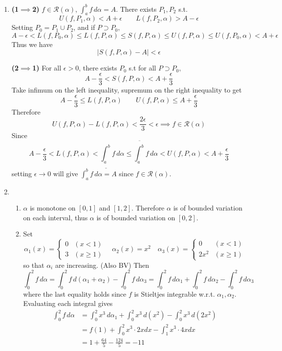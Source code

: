 \documentclass[11pt]{report}
\newcommand{\mc}[1]{\mathcal{#1}}
\newcommand{\ra}{\rightarrow}
\newcommand{\abs}[1]{\left|#1\right|}
\newcommand{\imp}{\implies}
\newcommand{\mimp}{$\implies$}
\renewcommand{\d}{\,d}
\newcommand{\lint}[1]{\underline{\int#1}}
\newcommand{\uint}[1]{\overline{\int#1}}
\begin{document}
\begin{enumerate}
\item \textsf{\textbf{(1\mimp2)}} $f\in \mc{R}(\alpha)$, $\int_a^b f\d\alpha = A$. There exists $P_1, P_2$ s.t.
$$U(f, P_1, \alpha) < A+\epsilon \qquad L(f, P_2, \alpha) > A- \epsilon$$
Setting $P_0 = P_1\cup P_2$, and if $P\supset P_0$,
$$A-\epsilon < L(f, P_0, \alpha) \leq L(f, P, \alpha) \leq S(f, P, \alpha) \leq U(f, P, \alpha) \leq U(f, P_0, \alpha) < A+ \epsilon$$
Thus we have
$$\abs{S(f, P, \alpha) - A} <\epsilon$$

\textsf{\textbf{(2\mimp1)}} For all $\epsilon > 0$, there exists $P_0$ s.t for all $P\supset P_0$, $$A - \frac{\epsilon}{3} < S(f, P, \alpha) < A+\frac{\epsilon}{3}$$
Take infimum on the left inequality, supremum on the right inequality to get
$$A-\frac{\epsilon}{3} \leq L(f, P, \alpha) \qquad U(f, P, \alpha) \leq A+\frac{\epsilon}{3}$$
Therefore
$$U(f, P, \alpha) - L(f, P, \alpha) < \frac{2\epsilon}{3} <\epsilon \imp f\in \mc{R}(\alpha)$$
Since
$$ A - \frac{\epsilon}{3} < L(f, P, \alpha) < \lint{_a^b} f\d\alpha \leq \uint{_a^b}f\d\alpha < U(f, P, \alpha) < A + \frac{\epsilon}{3}$$
setting $\epsilon\ra 0$ will give $\int_a^b f\d\alpha = A$ since $f\in \mc{R}(\alpha)$.


\item
\begin{enumerate}
	\item $\alpha$ is monotone on $[0, 1]$ and $[1, 2]$. Therefore $\alpha$ is of bounded variation on each interval, thus $\alpha$ is of bounded variation on $[0, 2]$.
	\item Set
	$$\alpha_1(x) = \begin{cases}
	0& (x < 1) \\ 3 & (x\geq 1)
	\end{cases} \quad \alpha_2(x) = x^2 \quad \alpha_3(x) = \begin{cases}
		0 & (x < 1) \\ 2x^2 & (x \geq 1)
	\end{cases}$$
	so that $\alpha_i$ are increasing. (Also BV) Then $$\int_0^2 f\d\alpha = \int_0^2 f \d(\alpha_1 + \alpha_2) - \int_0^2 f\d\alpha_3 = \int_0^2 f \d\alpha_1 + \int_0^2 f \d\alpha_2 - \int_0^2 f\d\alpha_3$$
	where the last equality holds since $f$ is Stieltjes integrable w.r.t. $\alpha_1, \alpha_2$.
	Evaluating each integral gives
	$$\begin{aligned}
	\int_0^2 f\d\alpha &= \int_0^2 x^3 \d\alpha_1 + \int_0^2 x^3 \d(x^2) - \int_0^2 x^3 \d(2x^2) \\
	&=f(1) + \int_0^2 x^3\cdot 2xdx  - \int_1^2 x^3\cdot 4xdx\\
	&=1 + \frac{64}{5} - \frac{124}{5} = -11
	\end{aligned}$$
\end{enumerate}
\end{enumerate}
\end{document}
